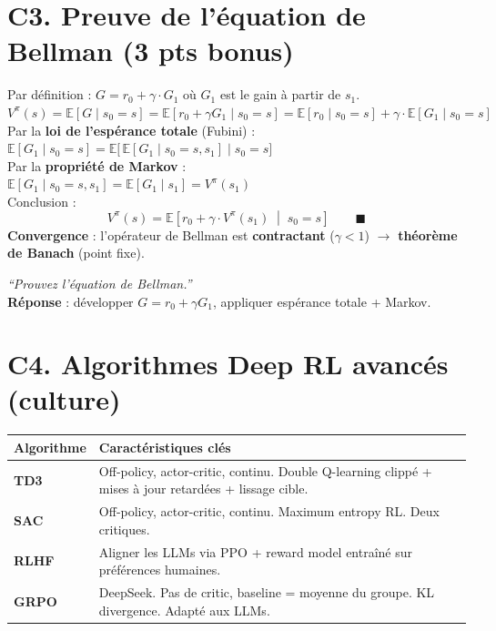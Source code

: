 \documentclass[11pt,a4paper]{article}
\newcommand{\E}{\mathbb{E}}
\begin{document}
\section{C3. Preuve de l'équation de Bellman (3 pts bonus)}

\begin{formbox}[Preuve]
Par définition : $G = r_0 + \gamma \cdot G_1$ \quad où $G_1$ est le gain à partir de $s_1$.\\[4pt]
$V^\pi(s) = \E[G \mid s_0=s] = \E[r_0 + \gamma G_1 \mid s_0=s] = \E[r_0 \mid s_0=s] + \gamma \cdot \E[G_1 \mid s_0=s]$\\[4pt]
Par la \textbf{loi de l'espérance totale} (Fubini) :\\
$\E[G_1 \mid s_0=s] = \E\!\big[\,\E[G_1 \mid s_0=s, s_1] \;\big|\; s_0=s\big]$\\[4pt]
Par la \textbf{propriété de Markov} :\\
$\E[G_1 \mid s_0=s, s_1] = \E[G_1 \mid s_1] = V^\pi(s_1)$\\[4pt]
Conclusion :
$$\boxed{V^\pi(s) = \E\!\left[r_0 + \gamma \cdot V^\pi(s_1) \;\middle|\; s_0=s\right] \qquad \blacksquare}$$
\textbf{Convergence} : l'opérateur de Bellman est \textbf{contractant} ($\gamma < 1$) $\to$ \textbf{théorème de Banach} (point fixe).
\end{formbox}

\begin{exambox}
\textit{``Prouvez l'équation de Bellman.''}\\[4pt]
\textbf{Réponse} : développer $G = r_0 + \gamma G_1$, appliquer espérance totale + Markov.
\end{exambox}

\section{C4. Algorithmes Deep RL avancés (culture)}

\begin{formbox}
\renewcommand{\arraystretch}{1.3}
\begin{tabular}{@{}l p{10cm}@{}}
\toprule
\textbf{Algorithme} & \textbf{Caractéristiques clés} \\
\midrule
\textbf{TD3} & Off-policy, actor-critic, continu. Double Q-learning clippé + mises à jour retardées + lissage cible. \\
\textbf{SAC} & Off-policy, actor-critic, continu. Maximum entropy RL. Deux critiques. \\
\textbf{RLHF} & Aligner les LLMs via PPO + reward model entraîné sur préférences humaines. \\
\textbf{GRPO} & DeepSeek. Pas de critic, baseline = moyenne du groupe. KL divergence. Adapté aux LLMs. \\
\bottomrule
\end{tabular}
\end{formbox}
\end{document}
